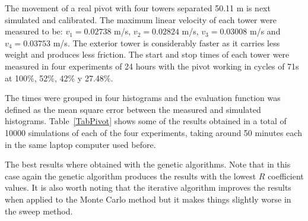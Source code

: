 \documentclass[review,authoryear]{elsarticle}
\begin{document}
The movement of a real pivot with four towers separated 50.11 m is next simulated and calibrated. The maximum linear velocity of each tower were measured to be: $v_1=0.02738$ m/s, $v_2=0.02824$ m/s, $v_3=0.03008$ m/s and $v_4=0.03753$ m/s.
The exterior tower is considerably faster as it carries less weight and produces less friction.
The start and stop times of each tower were measured in four experiments of 24 hours with the pivot working in cycles of 71s at 100\%, 52\%, 42\% y 27.48\%.

The times were grouped in four histograms and the evaluation function was defined as the mean square error between the measured and simulated histograms.
Table~\ref{TabPivot} shows some of the results obtained in a total of 10000 simulations of each of the four experiments, taking around 50 minutes each in the same laptop computer used before.

The best results where obtained with the genetic algorithms. Note that in this case again the genetic algorithm produces the results with the lowest $R$ coefficient values. It is also worth noting that the iterative algorithm improves the results when applied to the Monte Carlo method but it makes things slightly worse in the sweep method.
\end{document}
